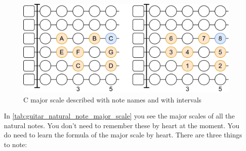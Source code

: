 \begin{figure}[h]
	\centering
	\includegraphics[height=0.2\textheight]{../../Images/CMajorScaleFirstPosition.png}
	\caption{C major scale described with note names and with intervals}
	\label{fig:guitar_c_major_scale_first_position}
\end{figure}

In \autoref{tab:guitar_natural_note_major_scale} you see the major scales of all the natural notes. You don't need to remember these by heart at the moment. You do need to learn the formula of the major scale by heart. There are three things to note:

